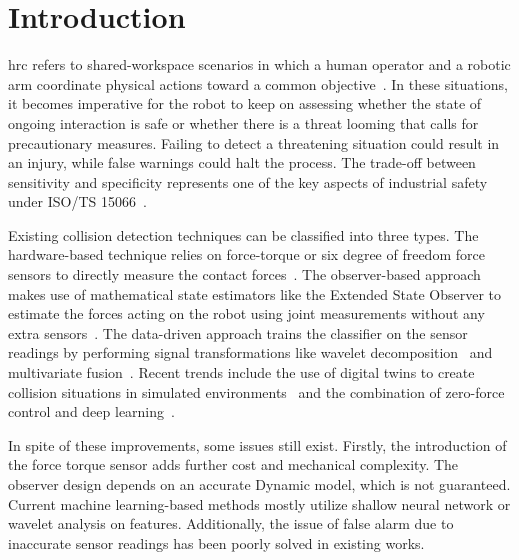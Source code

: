 \documentclass[DTMColor]{ROB-New}
\begin{document}
\maketitle

\section{Introduction}\label{sec:introduction}

\Ac{hrc} refers to shared-workspace scenarios in which a human operator and a robotic arm coordinate physical actions toward a common objective~\cite{selvaggio2021autonomy}. In these situations, it becomes imperative for the robot to keep on assessing whether the state of ongoing interaction is safe or whether there is a threat looming that calls for precautionary measures. Failing to detect a threatening situation could result in an injury, while false warnings could halt the process. The trade-off between sensitivity and specificity represents one of the key aspects of industrial safety under ISO/TS 15066~\cite{iso15066}.

Existing collision detection techniques can be classified into three types. The hardware-based technique relies on force-torque or six degree of freedom force sensors to directly measure the contact forces~\cite{wang2025sixdof}. The observer-based approach makes use of mathematical state estimators like the Extended State Observer to estimate the forces acting on the robot using joint measurements without any extra sensors~\cite{tonti2024eso}. The data-driven approach trains the classifier on the sensor readings by performing signal transformations like wavelet decomposition~\cite{niu2024wavelet} and multivariate fusion~\cite{fang2024multivariate}. Recent trends include the use of digital twins to create collision situations in simulated environments~\cite{an2024digitaltwin} and the combination of zero-force control and deep learning~\cite{zhao2025zeroforce}.

In spite of these improvements, some issues still exist. Firstly, the introduction of the force torque sensor adds further cost and mechanical complexity. The observer design depends on an accurate Dynamic model, which is not guaranteed. Current machine learning-based methods mostly utilize shallow neural network or wavelet analysis on features. Additionally, the issue of false alarm due to inaccurate sensor readings has been poorly solved in existing works.
\end{document}
